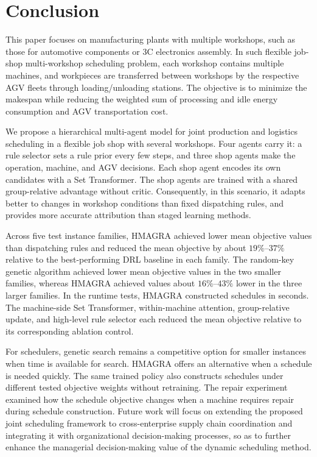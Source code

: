 \section{Conclusion}
\label{sec:conclusion}

This paper focuses on manufacturing plants with multiple workshops, such as those for automotive components or 3C
electronics assembly. In such flexible job-shop multi-workshop scheduling problem, 
each workshop contains multiple machines, and workpieces are transferred between workshops by 
the respective AGV fleets through loading/unloading stations. The objective is to minimize the makespan while
reducing the weighted sum of processing and idle energy consumption and AGV transportation cost.

We propose a hierarchical multi-agent model for joint production and logistics scheduling in a flexible job shop 
with several workshops. Four agents carry it: a rule selector sets a rule prior every few steps, 
and three shop agents make the operation, machine, and AGV decisions. Each shop agent encodes its own
candidates with a Set Transformer. The shop agents are trained with a shared group-relative advantage without critic. 
Consequently, in this scenario, it adapts better to changes in workshop conditions than fixed dispatching rules, 
and provides more accurate attribution than staged learning methods.

Across five test instance families, HMAGRA achieved lower mean objective
values than dispatching rules and reduced the mean objective by about
$19\%$--$37\%$ relative to the best-performing DRL baseline in each family.
The random-key genetic algorithm achieved lower mean objective values in
the two smaller families, whereas HMAGRA achieved values about
$16\%$--$43\%$ lower in the three larger families. In the runtime tests,
HMAGRA constructed schedules in seconds. The machine-side Set Transformer,
within-machine attention, group-relative update, and high-level rule selector
each reduced the mean objective relative to its corresponding ablation control.

For schedulers, genetic search remains a competitive option for smaller
instances when time is available for search. HMAGRA offers an alternative
when a schedule is needed quickly. The same trained policy also constructs
schedules under different tested objective weights without retraining. The
repair experiment examined how the schedule objective changes when a machine
requires repair during schedule construction. Future work will focus on
extending the proposed joint scheduling framework to cross-enterprise supply chain coordination and 
integrating it with organizational decision-making processes, 
so as to further enhance the managerial decision-making value of the dynamic scheduling method.
\ifanonymized\else
